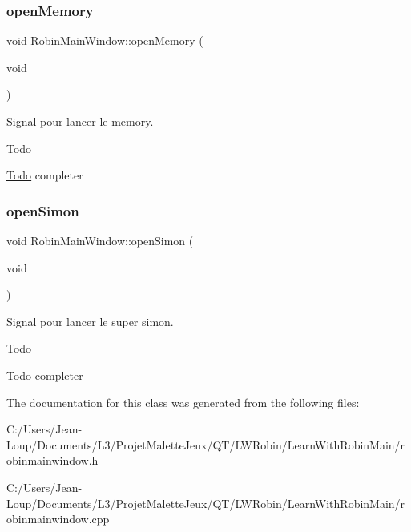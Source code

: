 \subsubsection{\texorpdfstring{open\+Memory}{openMemory}}
{\footnotesize\ttfamily void Robin\+Main\+Window\+::open\+Memory (\begin{DoxyParamCaption}\item[{void}]{ }\end{DoxyParamCaption})\hspace{0.3cm}{\ttfamily [slot]}}



Signal pour lancer le memory. 

\begin{DoxyRefDesc}{Todo}
\item[\hyperlink{todo__todo000025}{Todo}]completer \end{DoxyRefDesc}
\mbox{\label{class_robin_main_window_ab00b403de3169493a08c53f5d623ce6b}} 
\subsubsection{\texorpdfstring{open\+Simon}{openSimon}}
{\footnotesize\ttfamily void Robin\+Main\+Window\+::open\+Simon (\begin{DoxyParamCaption}\item[{void}]{ }\end{DoxyParamCaption})\hspace{0.3cm}{\ttfamily [slot]}}



Signal pour lancer le super simon. 

\begin{DoxyRefDesc}{Todo}
\item[\hyperlink{todo__todo000024}{Todo}]completer \end{DoxyRefDesc}


The documentation for this class was generated from the following files\+:\begin{DoxyCompactItemize}
\item 
C\+:/\+Users/\+Jean-\/\+Loup/\+Documents/\+L3/\+Projet\+Malette\+Jeux/\+Q\+T/\+L\+W\+Robin/\+Learn\+With\+Robin\+Main/robinmainwindow.\+h\item 
C\+:/\+Users/\+Jean-\/\+Loup/\+Documents/\+L3/\+Projet\+Malette\+Jeux/\+Q\+T/\+L\+W\+Robin/\+Learn\+With\+Robin\+Main/robinmainwindow.\+cpp\end{DoxyCompactItemize}
